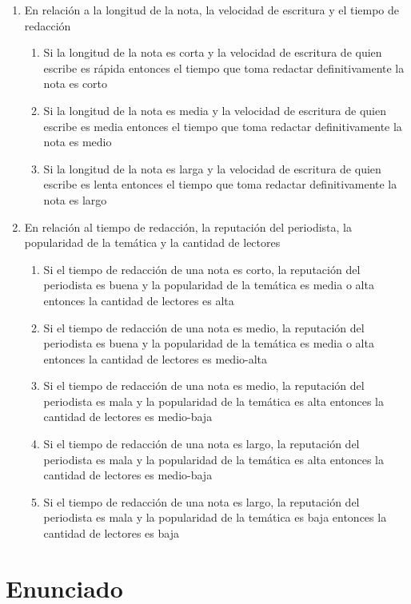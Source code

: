 \documentclass{article}
\begin{document}
\begin{itemize}
\begin{enumerate}
	\item En relación a la longitud de la nota, la velocidad de escritura y el tiempo de redacción
		\begin{enumerate}
			\item Si la longitud de la nota es corta y la velocidad de escritura de quien escribe es rápida entonces el tiempo que toma redactar definitivamente la nota es corto
			\item Si la longitud de la nota es media y la velocidad de escritura de quien escribe es media entonces el tiempo que toma redactar definitivamente la nota es medio
			\item Si la longitud de la nota es larga y la velocidad de escritura de quien escribe es lenta entonces el tiempo que toma redactar definitivamente la nota es largo
		\end{enumerate}
	\item En relación al tiempo de redacción, la reputación del periodista, la popularidad de la temática y la cantidad de lectores
		\begin{enumerate}
			\item Si el tiempo de redacción de una nota es corto, la reputación del periodista es buena y la popularidad de la temática es media o alta entonces la cantidad de lectores es alta
			\item Si el tiempo de redacción de una nota es medio, la reputación del periodista es buena y la popularidad de la temática es media o alta entonces la cantidad de lectores es medio-alta
			\item Si el tiempo de redacción de una nota es medio, la reputación del periodista es mala y la popularidad de la temática es alta entonces la cantidad de lectores es medio-baja
			\item Si el tiempo de redacción de una nota es largo, la reputación del periodista es mala y la popularidad de la temática es alta entonces la cantidad de lectores es medio-baja
			\item Si el tiempo de redacción de una nota es largo, la reputación del periodista es mala y la popularidad de la temática es baja entonces la cantidad de lectores es baja
		\end{enumerate}
\end{enumerate}

\section*{Enunciado}


\end{itemize}
\end{document}
